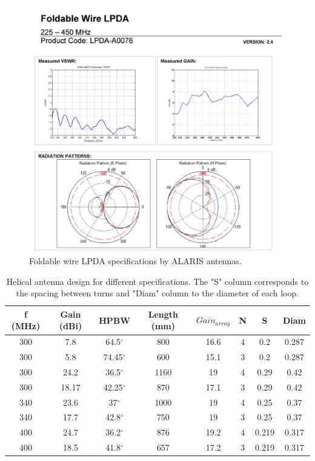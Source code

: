 \begin{figure}[htb]
    \centering
    \includegraphics[width=1\textwidth]{figures/Yannis/lpda23.jpg}
    \caption{Foldable wire LPDA specifications by ALARIS antennas.}
    \label{LPDA2}
\end{figure}

\begin{table}[htb]
\centering
\begin{tabular}{| c | c | c | c | c | c | c | c |}
\hline
 f (MHz) & Gain (dBi) & HPBW & Length (mm) & $Gain_{array}$ & N & S & Diam \\ 
 \hline
 300 & 7.8 & 64.5$^\circ$ & 800 & 16.6 & 4 & 0.2 & 0.287 \\  
 \hline
 300 & 5.8 & 74.45$^\circ$ & 600 & 15.1 & 3 & 0.2 & 0.287 \\  
 \hline
 300 & 24.2 & 36.5$^\circ$ & 1160 & 19 & 4 & 0.29 & 0.42 \\
 \hline
 300 & 18.17 & 42.25$^\circ$ & 870 & 17.1 & 3 & 0.29 & 0.42  \\
 \hline
 340 & 23.6 & 37$^\circ$ & 1000 & 19 & 4 & 0.25 & 0.37  \\
 \hline
 340 & 17.7 & 42.8$^\circ$ & 750 & 19 & 3 & 0.25 & 0.37  \\
 \hline
 400 & 24.7 & 36.2$^\circ$ & 876 & 19.2 & 4 & 0.219 & 0.317  \\
 \hline
 400 & 18.5 & 41.8$^\circ$ & 657 & 17.2 & 3 & 0.219 & 0.317  \\
 \hline
\end{tabular}
\caption{Helical antenna design for different specifications. The "S" column corresponds to the spacing between turns and "Diam" column to the diameter of each loop.}
\label{table: Helicals}
\end{table}

